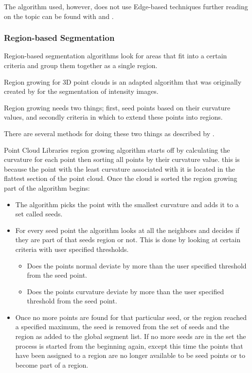 		The algorithm used, however, does not use Edge-based techniques further reading on the topic can be found with \cite{sappa_fast_2001} and \cite{bhanu_automatic_1986}.
		
		
	\subsubsection{Region-based Segmentation}
		Region-based segmentation algorithms look for areas that fit into a certain criteria and group them together as a single region.
		
		Region growing for 3D point clouds is an adapted algorithm that was originally created by \cite{adams_seeded_1994} for the segmentation of intensity images.
		
		Region growing needs two things; first, seed points based on their curvature values, and secondly criteria in which to extend these points into regions.
		
		There are several methods for doing these two things as described by \cite{hoover_experimental_1996}.
		
		Point Cloud Libraries region growing algorithm starts off by calculating the curvature for each point then sorting all points by their curvature value. this is because the point with the least curvature associated with it is located in the flattest section of the point cloud. Once the cloud is sorted the region growing part of the algorithm begins:

		\renewcommand\labelitemi{{\boldmath$\cdot$}}
		\begin{itemize}
			\item The algorithm picks the point with the smallest curvature and adds it to a set called seeds.
			
			\item For every seed point the algorithm looks at all the neighbors and decides if they are part of that seeds region or not. This is done by looking at certain criteria with user specified thresholds.
			
			\begin{itemize}
				\item Does the points normal deviate by more than the user specified threshold from the seed point.
				
				\item Does the points curvature deviate by more than the user specified threshold from the seed point.
				
			\end{itemize}
			
			\item Once no more points are found for that particular seed, or the region reached a specified maximum, the seed is removed from the set of seeds and the region as added to the global segment list. If no more seeds are in the set the process is started from the beginning again, except this time the points that have been assigned to a region are no longer available to be seed points or to become part of a region.
			
		\end{itemize}
		
